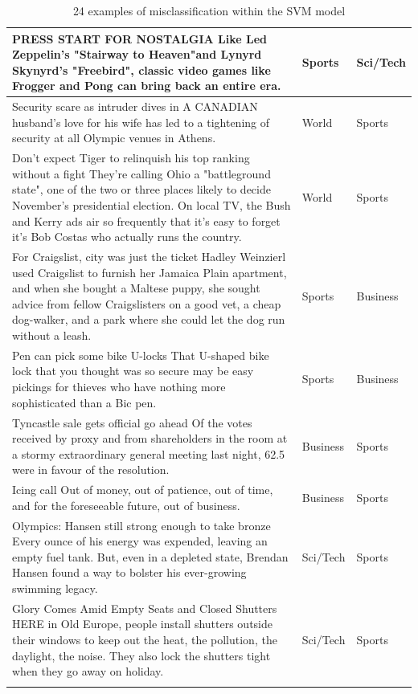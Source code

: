 \documentclass[12pt,a4paper,english]{article}
\begin{document}
\begin{longtable}{| m{25em} | m{5em} | m{5em} |}
        PRESS START FOR NOSTALGIA Like Led Zeppelin's "Stairway to Heaven"and Lynyrd Skynyrd's "Freebird", classic video games like Frogger and Pong can bring back an entire era. & Sports & Sci/Tech \\ \hline
        
        Security scare as intruder dives in A CANADIAN husband's love for his wife has led to a tightening of security at all Olympic venues in Athens. & World & Sports \\ \hline
        
        Don't expect Tiger to relinquish his top ranking without a fight They're calling Ohio a "battleground state", one of the two or three places likely to decide November's presidential election. On local TV, the Bush and Kerry ads air so frequently that it's easy to forget it's Bob Costas who actually runs the country. & World & Sports \\ \hline
        
        For Craigslist, city was just the ticket Hadley Weinzierl used Craigslist to furnish her Jamaica Plain apartment, and when she bought a Maltese puppy, she sought advice from fellow Craigslisters on a good vet, a cheap dog-walker, and a park where she could let the dog run without a leash. & Sports & Business \\ \hline
        
        Pen can pick some bike U-locks That U-shaped bike lock that you thought was so secure may be easy pickings for thieves who have nothing more sophisticated than a Bic pen. & Sports & Business \\ \hline
        
        Tyncastle sale gets official go ahead Of the votes received by proxy and from shareholders in the room at a stormy extraordinary general meeting last night, 62.5 were in favour of the resolution. & Business & Sports \\ \hline
        
        Icing call Out of money, out of patience, out of time, and for the foreseeable future, out of business. & Business & Sports \\ \hline
        
        Olympics: Hansen still strong enough to take bronze Every ounce of his energy was expended, leaving an empty fuel tank. But, even in a depleted state, Brendan Hansen found a way to bolster his ever-growing swimming legacy. & Sci/Tech & Sports \\ \hline
        
        Glory Comes Amid Empty Seats and Closed Shutters HERE in Old Europe, people install shutters outside their windows to keep out the heat, the pollution, the daylight, the noise. They also lock the shutters tight when they go away on holiday. & Sci/Tech & Sports \\ \hline

\caption{24 examples of misclassification within the SVM model}
\label{tab:misclassificationSVM}
\end{longtable}
\end{document}
